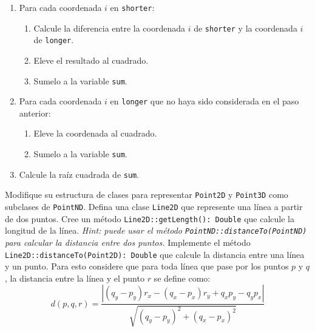 \begin{Exercise}[title={Puntos en el espacio}, label={oop:principios:ejercicios:puntos}]
\begin{enumerate}
        \item Para cada coordenada \(i\) en \texttt{shorter}:
          \begin{enumerate}
            \item Calcule la diferencia entre la coordenada \(i\) de \texttt{shorter} y la 
              coordenada \(i\) de \texttt{longer}.
            \item Eleve el resultado al cuadrado.
            \item Sumelo a la variable \texttt{sum}.
          \end{enumerate}
        \item Para cada coordenada \(i\) en \texttt{longer} que no haya sido considerada en el paso 
          anterior:
          \begin{enumerate}
            \item Eleve la coordenada al cuadrado.
            \item Sumelo a la variable \texttt{sum}.
          \end{enumerate}
        \item Calcule la raíz cuadrada de \texttt{sum}.
      \end{enumerate}
    \Question Modifique su estructura de clases para representar \texttt{Point2D} y \texttt{Point3D} 
      como subclases de \texttt{PointND}.
    \Question Defina una clase \texttt{Line2D} que represente una línea a partir de dos puntos.
    \Question Cree un método \texttt{Line2D::getLength(): Double} que calcule la longitud de la 
      línea.
      \textit{Hint: puede usar el método \texttt{PointND::distanceTo(PointND)} para calcular la
      distancia entre dos puntos.}
    \Question Implemente el método \texttt{Line2D::distanceTo(Point2D): Double} que calcule la 
      distancia entre una línea y un punto.
      Para esto considere que para toda línea que pase por los puntos \(p\) y \(q\), la distancia
      entre la línea y el punto \(r\) se define como:
      \[
        d(p, q, r) = \frac{
          |(q_y - p_y)r_x - (q_x - p_x)r_y + q_xp_y - q_yp_x|
        }{
          \sqrt{(q_y - p_y)^2 + (q_x - p_x)^2}
        }
      \]
  \end{Exercise}

